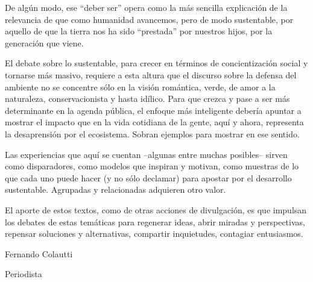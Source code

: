 De algún modo, ese ``deber ser'' opera como la más sencilla explicación
de la relevancia de que como humanidad avancemos, pero de modo
sustentable, por aquello de que la tierra nos ha sido ``prestada'' por
nuestros hijos, por la generación que viene.

El debate sobre lo sustentable, para crecer en términos de
concientización social y tornarse más masivo, requiere a esta altura que
el discurso sobre la defensa del ambiente no se concentre sólo en la
visión romántica, verde, de amor a la naturaleza, conservacionista y
hasta idílico. Para que crezca y pase a ser más determinante en la
agenda pública, el enfoque más inteligente debería apuntar a mostrar el
impacto que en la vida cotidiana de la gente, aquí y ahora, representa
la desaprensión por el ecosistema. Sobran ejemplos para mostrar en ese
sentido.

Las experiencias que aquí se cuentan --algunas entre muchas posibles--
sirven como disparadores, como modelos que inspiran y motivan, como
muestras de lo que cada uno puede hacer (y no sólo declamar) para
apostar por el desarrollo sustentable. Agrupadas y relacionadas
adquieren otro valor.

El aporte de estos textos, como de otras acciones de divulgación, es que
impulsan los debates de estas temáticas para regenerar ideas, abrir
miradas y perspectivas, repensar soluciones y alternativas, compartir
inquietudes, contagiar entusiasmos.

Fernando Colautti

Periodista

\textbf{\\
}